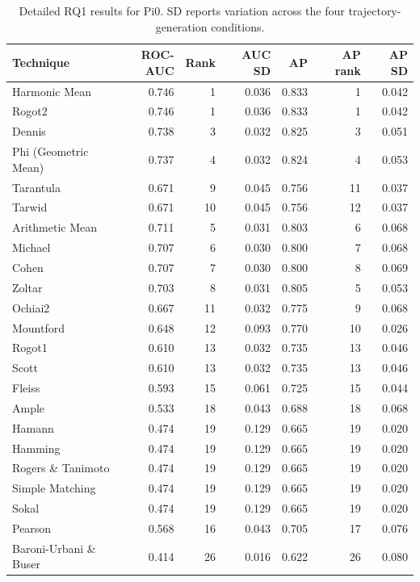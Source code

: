 \begin{table}[t]
\centering
\caption{Detailed RQ1 results for Pi0. SD reports variation across the four trajectory-generation conditions.}
\label{tab:rq1-supplementary-pi0}
{\scriptsize
\setlength{\tabcolsep}{4pt}
\renewcommand{\arraystretch}{0.96}
\begin{tabular}{lrrrrrr}
\toprule
Technique & ROC-AUC & Rank & AUC SD & AP & AP rank & AP SD \\
\midrule
Harmonic Mean & 0.746 & 1 & 0.036 & 0.833 & 1 & 0.042 \\
Rogot2 & 0.746 & 1 & 0.036 & 0.833 & 1 & 0.042 \\
Dennis & 0.738 & 3 & 0.032 & 0.825 & 3 & 0.051 \\
Phi (Geometric Mean) & 0.737 & 4 & 0.032 & 0.824 & 4 & 0.053 \\
Tarantula & 0.671 & 9 & 0.045 & 0.756 & 11 & 0.037 \\
Tarwid & 0.671 & 10 & 0.045 & 0.756 & 12 & 0.037 \\
Arithmetic Mean & 0.711 & 5 & 0.031 & 0.803 & 6 & 0.068 \\
Michael & 0.707 & 6 & 0.030 & 0.800 & 7 & 0.068 \\
Cohen & 0.707 & 7 & 0.030 & 0.800 & 8 & 0.069 \\
Zoltar & 0.703 & 8 & 0.031 & 0.805 & 5 & 0.053 \\
Ochiai2 & 0.667 & 11 & 0.032 & 0.775 & 9 & 0.068 \\
Mountford & 0.648 & 12 & 0.093 & 0.770 & 10 & 0.026 \\
Rogot1 & 0.610 & 13 & 0.032 & 0.735 & 13 & 0.046 \\
Scott & 0.610 & 13 & 0.032 & 0.735 & 13 & 0.046 \\
Fleiss & 0.593 & 15 & 0.061 & 0.725 & 15 & 0.044 \\
Ample & 0.533 & 18 & 0.043 & 0.688 & 18 & 0.068 \\
Hamann & 0.474 & 19 & 0.129 & 0.665 & 19 & 0.020 \\
Hamming & 0.474 & 19 & 0.129 & 0.665 & 19 & 0.020 \\
Rogers \& Tanimoto & 0.474 & 19 & 0.129 & 0.665 & 19 & 0.020 \\
Simple Matching & 0.474 & 19 & 0.129 & 0.665 & 19 & 0.020 \\
Sokal & 0.474 & 19 & 0.129 & 0.665 & 19 & 0.020 \\
Pearson & 0.568 & 16 & 0.043 & 0.705 & 17 & 0.076 \\
Baroni-Urbani \& Buser & 0.414 & 26 & 0.016 & 0.622 & 26 & 0.080 \\

\end{tabular}}
\end{table}
